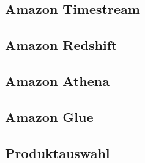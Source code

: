 \subsection{Amazon Timestream}

\subsection{Amazon Redshift}

\subsection{Amazon Athena}

\subsection{Amazon Glue}

\subsection{Produktauswahl}